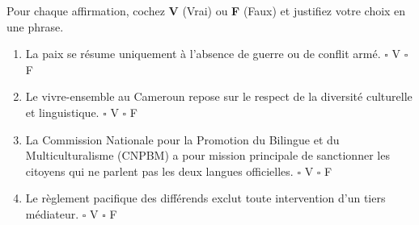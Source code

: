 \documentclass[11pt]{article}
\begin{document}
\begin{exercice}
Pour chaque affirmation, cochez \textbf{V} (Vrai) ou \textbf{F} (Faux) et justifiez votre choix en une phrase.
\begin{enumerate}
    \item La paix se résume uniquement à l'absence de guerre ou de conflit armé. \hfill $\square$ V \quad $\square$ F
    \item Le vivre-ensemble au Cameroun repose sur le respect de la diversité culturelle et linguistique. \hfill $\square$ V \quad $\square$ F
    \item La Commission Nationale pour la Promotion du Bilingue et du Multiculturalisme (CNPBM) a pour mission principale de sanctionner les citoyens qui ne parlent pas les deux langues officielles. \hfill $\square$ V \quad $\square$ F
    \item Le règlement pacifique des différends exclut toute intervention d'un tiers médiateur. \hfill $\square$ V \quad $\square$ F
\end{enumerate}
\end{exercice}
\end{document}
